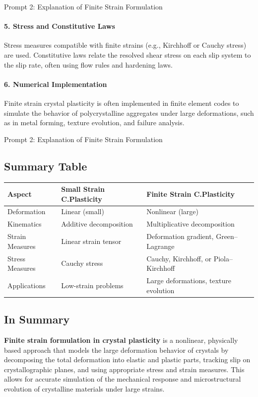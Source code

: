 \documentclass[12pt]{article}
\begin{document}
\begin{summary}{Prompt 2: Explanation of Finite Strain Formulation}
\paragraph{5. Stress and Constitutive Laws}
Stress measures compatible with finite strains (e.g., Kirchhoff or Cauchy
stress) are used. Constitutive laws relate the resolved shear stress on each
slip system to the slip rate, often using flow rules and hardening laws.

\paragraph{6. Numerical Implementation}
Finite strain crystal plasticity is often implemented in finite element codes
to simulate the behavior of polycrystalline aggregates under large
deformations, such as in metal forming, texture evolution, and failure
analysis.
\end{summary}

\begin{summary}{Prompt 2: Explanation of Finite Strain Formulation}
\subsection*{Summary Table}

\begin{center}
\begin{tabular}{@{}lll@{}}
\toprule
Aspect & Small Strain C.Plasticity & Finite Strain C.Plasticity \\
\midrule
Deformation    & Linear (small)            & Nonlinear (large) \\
Kinematics     & Additive decomposition    & Multiplicative decomposition \\
Strain Measures& Linear strain tensor      & Deformation gradient, Green--Lagrange \\
Stress Measures& Cauchy stress             & Cauchy, Kirchhoff, or Piola--Kirchhoff \\
Applications   & Low-strain problems       & Large deformations, texture evolution \\
\bottomrule
\end{tabular}
\end{center}

\subsection*{In Summary}
\noindent
\textbf{Finite strain formulation in crystal plasticity} is a nonlinear,
physically based approach that models the large deformation behavior of crystals
by decomposing the total deformation into elastic and plastic parts, tracking
slip on crystallographic planes, and using appropriate stress and strain
measures. This allows for accurate simulation of the mechanical response and
microstructural evolution of crystalline materials under large strains.
\end{summary}
\end{document}
